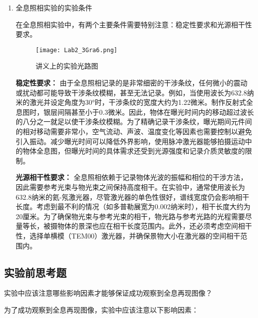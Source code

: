 \documentclass[dvipsnames, svgnames,a4paper,11pt]{article}
\begin{document}
\begin{enumerate}
		\item 全息照相实验的实验条件
		
		在全息照相实验中，有两个主要条件需要特别注意：稳定性要求和光源相干性要求。
		
		\begin{figure}[htbp]
			\centering
			\texttt{[image: Lab2\_3Gra6.png]}
			\caption{讲义上的实验光路图}
			\label{fig:fig6}
		\end{figure}
		
		\textbf{稳定性要求：} 由于全息照相记录的是非常细密的干涉条纹，任何微小的震动或扰动都可能导致干涉条纹模糊，甚至无法记录。例如，当使用波长为632.8纳米的激光并设定角度为30°时，干涉条纹的宽度大约为1.22微米。制作反射式全息图时，银层间隔甚至小于0.3微米。因此，物体在曝光时间内的移动超过波长的八分之一就足以使干涉条纹模糊。为了精确记录干涉条纹，曝光期间元件间的相对移动需要非常小，空气流动、声波、温度变化等因素也需要控制以避免引入振动。减少曝光时间可以降低外界影响，使用脉冲激光器能够拍摄运动中的物体全息图，但曝光时间的具体需求还受到光源强度和记录介质灵敏度的限制。
		
		\textbf{光源相干性要求：} 全息照相依赖于记录物体光波的振幅和相位的干涉方法，因此需要参考光束与物光束之间保持高度相干。在实验中，通常使用波长为632.8纳米的氦-氖激光器，尽管激光器的单色性很好，谱线宽度仍会影响相干长度。考虑到最不利的情况（如多普勒展宽为0.002纳米时），相干长度大约为20厘米。为了确保物光束与参考光束的相干，物光路与参考光路的光程需要尽量等长，被摄物体的景深也应在相干长度范围内。此外，还必须考虑空间相干性，选择单横模（TEM00）激光器，并确保景物大小在激光器的空间相干范围内。
	\end{enumerate}
	
	
	
	\subsection{实验前思考题}
	
	\begin{question}
		实验中应该注意哪些影响因素才能够保证成功观察到全息再现图像？
	\end{question}
	为了成功观察到全息再现图像，实验中应该注意以下影响因素：
	
\end{document}
